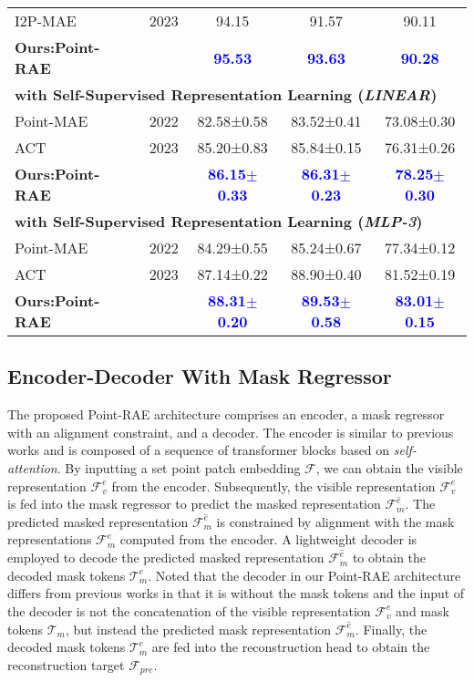 \documentclass[sigconf, screen]{acmart}
\begin{document}
\begin{table}
\begin{tabular}{@{}lcccc}
I2P-MAE \cite{zhang2022learning} &2023&94.15 &91.57 &90.11 \\
\textbf{Ours:Point-RAE} & &\textcolor{blue}{\bf 95.53} &\textcolor{blue}{\bf 93.63} &\textcolor{blue}{\bf 90.28} \\
\midrule[0.5pt]
\multicolumn{5}{l}{
\hspace{-0.5em}\textbf{with Self-Supervised Representation Learning (\textit{LINEAR})}}
\\
Point-MAE \cite{pang2022masked} &2022&82.58±0.58 &83.52±0.41 &73.08±0.30\\
ACT \cite{dong2022autoencoders} &2023&85.20±0.83 &85.84±0.15 &76.31±0.26   \\
\textbf{Ours:Point-RAE} && \textcolor{blue}{\bf 86.15$\pm$0.33}& \textcolor{blue}{\bf 86.31$\pm$0.23}& \textcolor{blue}{\bf 78.25$\pm$0.30}\\
\midrule[0.5pt]
\multicolumn{5}{l}{
\hspace{-0.5em}\textbf{with Self-Supervised Representation Learning (\textit{MLP-3})}}
\\
Point-MAE \cite{pang2022masked}&2022 & 84.29±0.55 &85.24±0.67 &77.34±0.12\\
ACT \cite{dong2022autoencoders} &2023& 87.14±0.22  &88.90±0.40 &81.52±0.19
 \\
\textbf{Ours:Point-RAE} && \textcolor{blue}{\bf 88.31$\pm$0.20}& \textcolor{blue}{\bf 89.53$\pm$0.58}&\textcolor{blue}{\bf 83.01$\pm$0.15}\\
\bottomrule[1pt]

\end{tabular}
\label{scan}
\end{table}

\subsection{Encoder-Decoder With Mask Regressor}
The proposed Point-RAE architecture comprises an encoder, a mask regressor with an alignment constraint, and a decoder. The encoder is similar to previous works and is composed of a sequence of transformer blocks based on \textit{self-attention}. 
By inputting a set point patch embedding $\mathcal{F}$, we can obtain the visible representation $\mathcal{F}_{v}^e$ from the encoder. Subsequently, the visible representation $\mathcal{F}_{v}^e$ is fed into the mask regressor to predict the masked representation $\mathcal{F}_m^{\hat{e}}$. The predicted masked representation $\mathcal{F}_m^{\hat{e}}$ is constrained by alignment with the mask representations $\mathcal{F}_m^e$ computed from the encoder. A lightweight decoder is employed to decode the predicted masked representation $\mathcal{F}_m^{\hat{e}}$ to obtain the decoded mask tokens $\mathcal{T}_{m}^e$. 
Noted that the decoder in our Point-RAE architecture differs from previous works in that it is without the mask tokens and the input of the decoder is not the concatenation of the visible representation $\mathcal{F}_{v}^e$ and mask tokens $\mathcal{T}_m$, but instead the predicted mask representation $\mathcal{F}_m^{\hat{e}}$. 
Finally, the decoded mask tokens $\mathcal{T}_{m}^e$ are fed into the reconstruction head to obtain the reconstruction target $\mathcal{F}_{pre}$.
\end{document}
